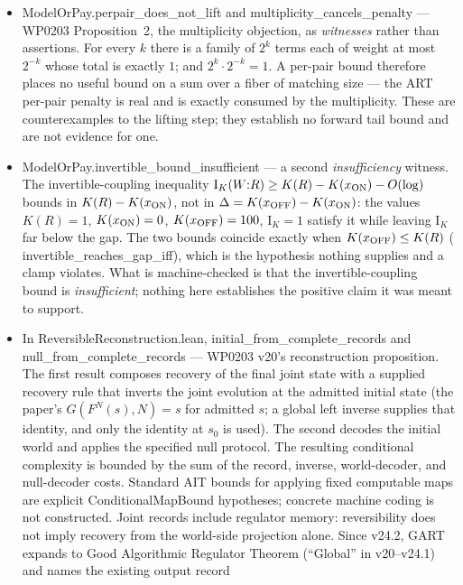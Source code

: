 \documentclass[11pt,a4paper]{article}
\newcommand{\lean}[1]{{\ttfamily\small
  \let\leanunderscore\_\def\_{\leanunderscore\allowbreak}#1}}
\newcommand{\Ik}{\mathrm{I}_K}
\begin{document}
\begin{itemize}[leftmargin=1.4em,itemsep=1pt]
clamp then needs no special pleading: by
\lean{clamp\_MAI\_bounded\_by\_own\_complexity}, $K(R)=O(1)$ alone caps its mutual algorithmic
information with every world.
\item \lean{ModelOrPay.perpair\_does\_not\_lift} and \lean{multiplicity\_cancels\_penalty}
--- WP0203 Proposition~2, the multiplicity objection, as \emph{witnesses} rather than assertions.
For every $k$ there is a family of $2^k$ terms each of weight at most $2^{-k}$ whose total is
exactly $1$; and $2^{k}\cdot2^{-k}=1$. A per-pair bound therefore places no useful bound on a sum
over a fiber of matching size --- the ART per-pair penalty is real and is exactly consumed by the
multiplicity. These are counterexamples to the lifting step; they establish no forward tail bound
and are not evidence for one.
\item \lean{ModelOrPay.invertible\_bound\_insufficient} --- a second \emph{insufficiency} witness. The
invertible-coupling inequality $\Ik(W{:}R)\ge K(R)-K(x_{\rm ON})-O(\log)$ bounds in
$K(R)-K(x_{\rm ON})$, not in $\Delta=K(x_{\rm OFF})-K(x_{\rm ON})$: the values $K(R)=1$,
$K(x_{\rm ON})=0$, $K(x_{\rm OFF})=100$, $\Ik=1$ satisfy it while leaving $\Ik$ far below the gap.
The two bounds coincide exactly when $K(x_{\rm OFF})\le K(R)$
(\lean{invertible\_reaches\_gap\_iff}), which is the hypothesis nothing supplies and a clamp
violates. What is machine-checked is that the invertible-coupling bound is \emph{insufficient};
nothing here establishes the positive claim it was meant to support.
\item In \lean{ReversibleReconstruction.lean}, \lean{initial\_from\_complete\_records} and
\lean{null\_from\_complete\_records} --- WP0203 v20's reconstruction proposition.
The first result composes recovery of the final joint state with a supplied
recovery rule that inverts the joint evolution at the admitted initial state
(the paper's $G(F^N(s),N)=s$ for admitted $s$; a global left inverse supplies that
identity, and only the identity at $s_0$ is used). The second decodes the initial world
and applies the specified null protocol. The resulting conditional complexity
is bounded by the sum of the record, inverse, world-decoder, and null-decoder
costs. Standard AIT bounds for applying fixed computable maps are explicit
\lean{ConditionalMapBound} hypotheses; concrete machine coding is not
constructed. Joint records include regulator memory: reversibility does not
imply recovery from the world-side projection alone. Since v24.2, GART expands to
Good Algorithmic Regulator Theorem (``Global'' in v20--v24.1) and names the existing output record

\end{itemize}
\end{document}
